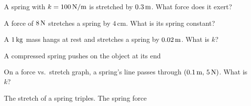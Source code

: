 \begin{exo}{}
A spring with $k=100\,\mathrm{N/m}$ is stretched by $0.3\,\mathrm{m}$. What force does it exert?
\choices{$30\N$}{$300\N$}{$3\N$}{$333\N$}
\end{exo}
\begin{exo}{}
A force of $8\,\mathrm{N}$ stretches a spring by $4\,\mathrm{cm}$. What is its spring constant?
\choices{$2\Nm$}{$0.5\Nm$}{$200\Nm$}{$32\Nm$}
\end{exo}
\begin{exo}{}
A $1\,\mathrm{kg}$ mass hangs at rest and stretches a spring by $0.02\,\mathrm{m}$. What is $k$?
\choices{$50\Nm$}{$500\Nm$}{$20\Nm$}{$5000\Nm$}
\end{exo}
\begin{exo}{}
A compressed spring pushes on the object at its end
\end{exo}
\begin{exo}{}
On a force vs.\ stretch graph, a spring's line passes through $(0.1\,\mathrm{m},\,5\,\mathrm{N})$. What is $k$?
\choices{$0.5\Nm$}{$5\Nm$}{$50\Nm$}{$500\Nm$}
\end{exo}
\begin{exo}{}
The stretch of a spring triples. The spring force
\end{exo}

